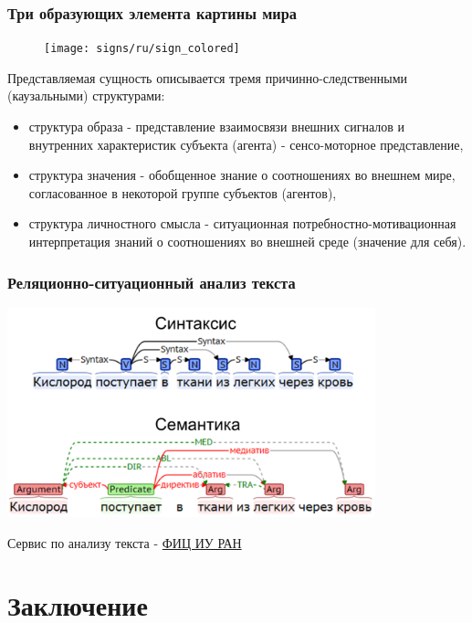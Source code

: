 \documentclass[default]{beamer}
\begin{document}
	\begin{frame}
		\frametitle{Три образующих элемента картины мира}
		\footnotesize
		\begin{figure}
		\texttt{[image: signs/ru/sign\_colored]}
		\end{figure}
		
		Представляемая сущность описывается тремя причинно-следственными (каузальными) структурами:
		\begin{itemize}
		\item {\color{red}структура образа} - представление взаимосвязи внешних сигналов и внутренних характеристик субъекта (агента) - сенсо-моторное представление,
		\item {\color{blue}структура значения} - обобщенное знание о соотношениях во внешнем мире, согласованное в некоторой группе субъектов (агентов),
		\item {\color{green!60!black}структура личностного смысла} - ситуационная потребностно-мотивационная интерпретация знаний о соотношениях во внешней среде (значение для себя).
		\end{itemize}
		\nocite{*}
		\printbibliography[keyword={qualia}, resetnumbers=true]
	\end{frame}
	
	\begin{frame}
		\frametitle{Реляционно-ситуационный анализ текста}
		\begin{center}
			\includegraphics[width=0.8\textwidth]{nlp.png}
		\end{center}
		
		
		\begin{tiny}
			\color{blue}
			Сервис по анализу текста - \href{http://nlp.isa.ru}{ФИЦ ИУ РАН}
			
		\end{tiny}
	\end{frame}
	
	\section{Заключение}
	
\end{document}
